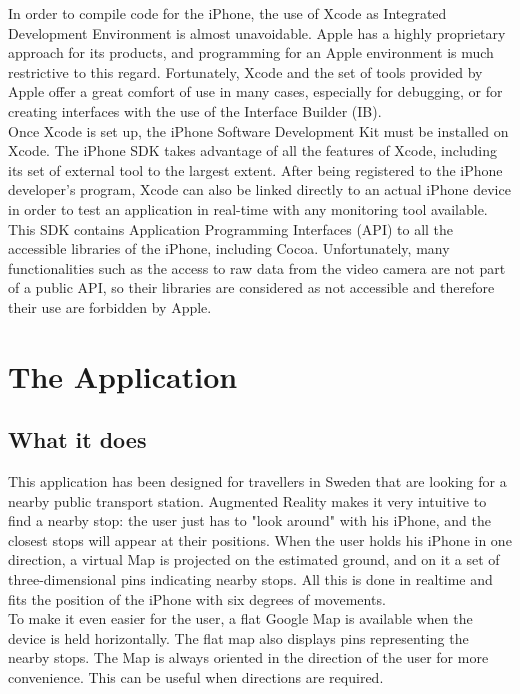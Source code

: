 In order to compile code for the iPhone, the use of Xcode as Integrated Development Environment is almost unavoidable. Apple has a highly proprietary approach for its products, and programming for an Apple environment is much restrictive to this regard. Fortunately, Xcode and the set of tools provided by Apple offer a great comfort of use in many cases, especially for debugging, or for creating interfaces with the use of the Interface Builder (IB).\\

Once Xcode is set up, the iPhone Software Development Kit must be installed on Xcode. The iPhone SDK takes advantage of all the features of Xcode, including its set of external tool to the largest extent. After being registered to the iPhone developer's program, Xcode can also be linked directly to an actual iPhone device in order to test an application in real-time with any monitoring tool available.\\

This SDK contains Application Programming Interfaces (API) to all the accessible libraries of the iPhone, including Cocoa. Unfortunately, many functionalities such as the access to raw data from the video camera are not part of a public API, so their libraries are considered as not accessible and therefore their use are forbidden by Apple.

\section{The Application}
\label{sec:the_application}

\subsection{What it does}

This application has been designed for travellers in Sweden that are looking for a nearby public transport station. Augmented Reality makes it very intuitive to find a nearby stop: the user just has to "look around" with his iPhone, and the closest stops will appear at their positions. When the user holds his iPhone in one direction, a virtual Map is projected on the estimated ground, and on it a set of three-dimensional pins indicating nearby stops. All this is done in realtime and fits the position of the iPhone with six degrees of movements.\\

To make it even easier for the user, a flat Google Map is available when the device is held horizontally. The flat map also displays pins representing the nearby stops. The Map is always oriented in the direction of the user for more convenience. This can be useful when directions are required. \\

